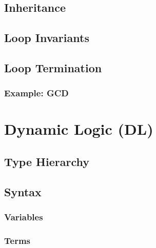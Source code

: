 \documentclass[a4paper, 11pt, accentcolor = tud3b]{tudreport}
\begin{document}
        \section{Inheritance} %

        \section{Loop Invariants} %

        \section{Loop Termination} %

            \subsection{Example: GCD} %

    \chapter{Dynamic Logic (DL)} %

        \section{Type Hierarchy} %

        \section{Syntax} %

            \subsection{Variables} %

            \subsection{Terms} %
\end{document}
